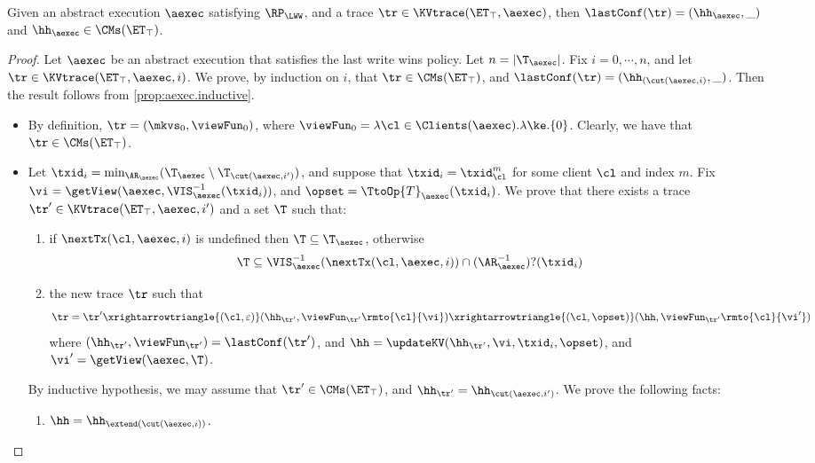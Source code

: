 \begin{proposition}
\label{prop:aexec2kvtrace}
Given an abstract execution $\aexec$ satisfying $\RP_{\LWW}$, 
and a trace $\tr \in \KVtrace(\ET_{\top}, \aexec)$,
then $\lastConf(\tr) = (\hh_{\aexec}, \_)$ and $\hh_{\aexec} \in \CMs(\ET_{\top})$. 
\end{proposition}
\begin{proof}
Let $\aexec$ be an abstract execution that satisfies the last write wins policy. 
Let $n = \lvert \T_{\aexec} \rvert$. Fix $i =0,\cdots, n$, 
and let $\tr \in \KVtrace(\ET_{\top}, \aexec, i)$. We prove, by 
induction on $i$, that $\tr \in \CMs(\ET_{\top})$, and 
$\lastConf(\tr) = (\hh_{(\cut(\aexec, i)}, \_)$. 
Then the result follows from  \cref{prop:aexec.inductive}.

\begin{itemize}
\item {} By definition, $\tr = (\mkvs_{0}, \viewFun_{0})$, 
where $\viewFun_{0} = \lambda \cl \in \Clients(\aexec). \lambda \ke.\{0\}$. 
Clearly, we have that $\tr \in \CMs(\ET_{\top})$. 
\item {} Let $\txid_{i} = \min_{\AR_{\aexec}}(\T_{\aexec} \setminus \T_{\cut(\aexec, i')})$, 
and suppose that $\txid_{i} = \txid_{\cl}^{m}$ for some client $\cl$ and index $m$. 
Fix $\vi = \getView(\aexec, \VIS_{\aexec}^{-1}(\txid_{i}))$, and  $\opset = \TtoOp{T}_{\aexec}(\txid_{i})$.
We prove that there exists a trace $\tr' \in \KVtrace(\ET_{\top}, \aexec, i')$ and a set 
$\T$ such that: 
\begin{enumerate}
\item if $\nextTx(\cl, \aexec, i)$ is undefined then $\T \subseteq \T_{\aexec}$, otherwise 
\[
    \T \subseteq \VIS^{-1}_{\aexec}(\nextTx(\cl, \aexec, i)) \cap (\AR_{\aexec}^{-1})?(\txid_{i})
\]
\item the new trace \( \tr \) such that
\[
\tr = \tr' \xrightarrowtriangle{(\cl, \varepsilon)} (\hh_{\tr'}, \viewFun_{\tr'}\rmto{\cl}{\vi}) \xrightarrowtriangle{(\cl, \opset)} 
(\hh,  \viewFun_{\tr'}\rmto{\cl}{\vi'})
\]
where $(\hh_{\tr'}, \viewFun_{\tr'}) = \lastConf(\tr')$, and $\hh = \updateKV(\hh_{\tr'}, \vi, \txid_{i}, \opset)$, 
and $\vi' = \getView(\aexec, \T)$.
\end{enumerate}
By inductive hypothesis, we may assume that $\tr' \in \CMs(\ET_{\top})$, and $\hh_{\tr'} = \hh_{\cut(\aexec, i')}$. 
We prove the following facts: 
\begin{enumerate}
\item $\hh = \hh_{\extend(\cut(\aexec, i))}$. 

\end{enumerate}
\end{itemize}
\end{proof}
